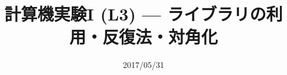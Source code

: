 \documentclass[dvipdfmx]{beamer}
\title{計算機実験I (L3) --- ライブラリの利用・反復法・対角化}
\date{2017/05/31}
\begin{document}
\begin{frame}
  \titlepage
  \tableofcontents
\end{frame}





\end{document}
